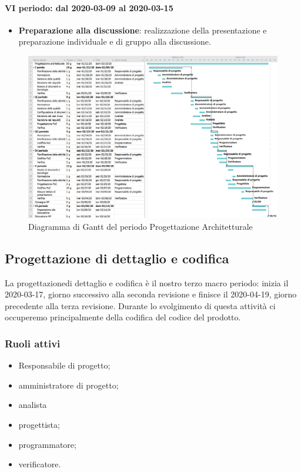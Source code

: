 \paragraph*{VI periodo: dal 2020-03-09 al 2020-03-15}
\begin{itemize}
	\item \textbf{Preparazione alla discussione}: realizzazione della presentazione e preparazione individuale e di gruppo alla discussione.
\end{itemize}

\begin{landscape}
	\begin{figure}
		\centering
		\includegraphics[scale=0.512]{./gantt/Progettazione architetturale.png}
		\caption{Diagramma di Gantt del periodo Progettazione Architetturale}
	\end{figure}
\end{landscape}
\pagebreak


\subsection{Progettazione di dettaglio e codifica}
La progettazione\glosp di dettaglio e codifica è il nostro terzo macro periodo: inizia il 2020-03-17, giorno successivo alla seconda revisione e finisce il 2020-04-19, giorno precedente alla terza revisione. Durante lo svolgimento di questa attività ci occuperemo principalmente della codifica del codice del prodotto\glo.

\subsubsection{Ruoli attivi}
\begin{itemize}
	\item Responsabile di progetto\glo;
	\item amministratore di progetto\glo;
	\item analista
	\item progettista;
	\item programmatore;
	\item verificatore.
\end{itemize}

